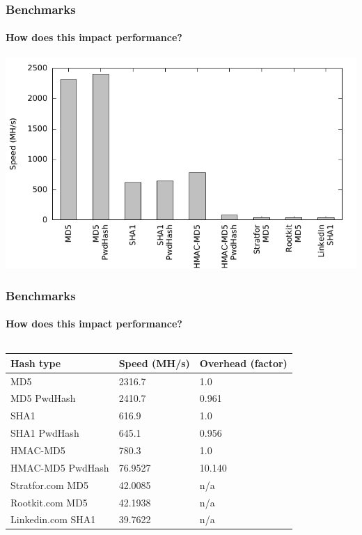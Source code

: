 \documentclass[handout, notes=hide]{beamer}
\begin{document}

\begin{frame}
\frametitle{Benchmarks}
\framesubtitle{How does this impact performance?}
\setlength{\parskip}{0.5em}

\includegraphics[width=1.0\textwidth]{benchmarks}

\end{frame}


\begin{frame}
\frametitle{Benchmarks}
\framesubtitle{How does this impact performance?}
\setlength{\parskip}{0.5em}

\begin{columns}[T]
\begin{column}[T]{1.0\textwidth}

\fontsize{9pt}{14}\selectfont

\begin{tabular}{p{4cm}|p{2.8cm}|p{2.8cm}}
	{\bf Hash type} & {\bf Speed (MH/s)} & {\bf Overhead (factor)} \\ \hline
	MD5 & 2316.7 & 1.0 \\
	MD5 PwdHash & 2410.7 & 0.961 \\
	SHA1 & 616.9 & 1.0 \\
	SHA1 PwdHash & 645.1 & 0.956 \\
	HMAC-MD5 & 780.3 & 1.0 \\
	HMAC-MD5 PwdHash & 76.9527 & 10.140 \\
	Stratfor.com MD5 & 42.0085 & n/a \\
	Rootkit.com MD5 & 42.1938 & n/a \\
	Linkedin.com SHA1 & 39.7622 & n/a \\
\end{tabular}%

\end{column}
\end{columns}

\end{frame}
\end{document}

